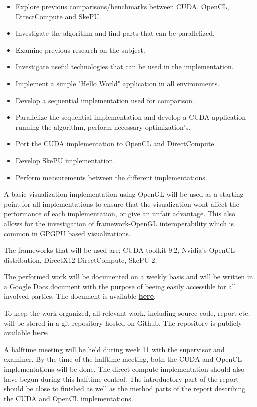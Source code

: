 \documentclass{article}
\begin{document}
\begin{itemize}
    \item Explore previous comparisons/benchmarks between CUDA, OpenCL, DirectCompute and SkePU. 
    \item Investigate the algorithm and find parts that can be parallelized.
    \item Examine previous research on the subject.
    \item Investigate useful technologies that can be used in the implementation.
    \item Implement a simple "Hello World" application in all environments.
    \item Develop a sequential implementation used for comparison.
    \item Parallelize the sequential implementation and develop a CUDA application running the algorithm, perform necessary optimization's.
    \item Port the CUDA implementation to OpenCL and DirectCompute.
    \item Develop SkePU implementation.
    \item Perform measurements between the different implementations.
\end{itemize}

A basic visualization implementation using OpenGL will be used as a starting point for all implementations to ensure that the visualization wont affect the performance of each implementation, or give an unfair advantage. This also allows for the investigation of framework-OpenGL interoperability which is common in GPGPU based visualizations. 

The frameworks that will be used are; CUDA toolkit 9.2, Nvidia's OpenCL distribution, DirectX12 DirectCompute, SkePU 2.

The performed work will be documented on a weekly basis and will be written in a Google Docs document with the purpose of beeing easily accessible for all involved parties. The document is available \href{https://docs.google.com/document/d/1Qh0x1YyBDKZFpO-7FzWSxgbB-Rh3ZNzeJHwVXME1f0k/edit?usp=sharing}{\textbf{here}}.

To keep the work organized, all relevant work, including source code, report etc. will be stored in a git repository hosted on Github. The repository is publicly available \href{https://github.com/adamsdm/MSc-project}{\textbf{here}}

A halftime meeting will be held during week 11 with the supervisor and examiner. By the time of the halftime meeting, both the CUDA and OpenCL implementations will be done. The direct compute implementation should also have begun during this halftime control. The introductory part of the report should be close to finished as well as the method parts of the report describing the CUDA and OpenCL implementations.
\end{document}
